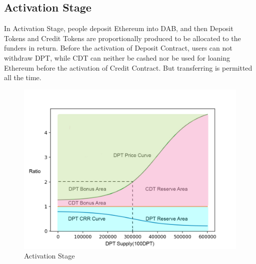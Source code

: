 \documentclass[review]{elsarticle}
\begin{document}
\subsection{Activation Stage}
In Activation Stage, people deposit Ethereum into DAB, and then Deposit Tokens and Credit Tokens are proportionally produced to be allocated to the funders in return. Before the activation of Deposit Contract, users can not withdraw DPT, while CDT can neither be cashed nor be used for loaning Ethereum before the activation of Credit Contract. But transferring is permitted all the time.

\begin{figure}[H]
\begin{center}
\includegraphics[width=4.5in]{Graphs/Activation1.jpg}
\end{center}
\caption{Activation Stage}\label{AS}
\end{figure}
\end{document}
